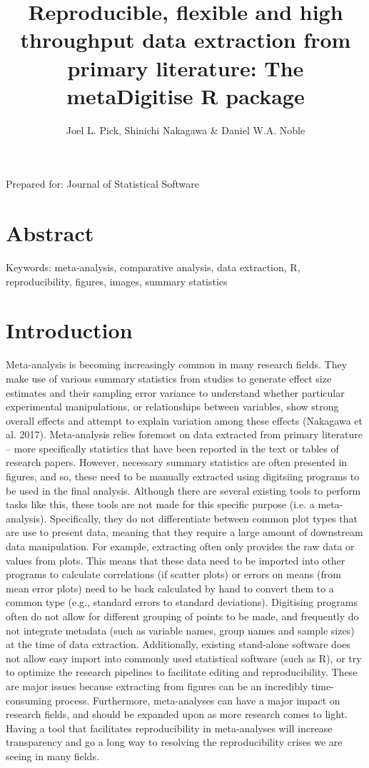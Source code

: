 \documentclass{article}
\title{Reproducible, flexible and high throughput data extraction from primary literature: The metaDigitise R package}
\author{Joel L. Pick, Shinichi Nakagawa \& Daniel W.A. Noble}
\begin{document}
\doublespacing

\maketitle
Prepared for: Journal of Statistical Software

\section*{Abstract}

Keywords: meta-analysis, comparative analysis, data extraction, R, reproducibility, figures, images, summary statistics

\clearpage
\section*{Introduction}

Meta-analysis is becoming increasingly common in many research fields. They make use of various summary statistics from studies to generate effect size estimates and their sampling error variance to understand whether particular experimental manipulations, or relationships between variables, show strong overall effects and attempt to explain variation among these effects (Nakagawa et al. 2017). Meta-analysis relies foremost on data extracted from primary literature – more specifically statistics that have been reported in the text or tables of research papers. However, necessary summary statistics are often presented in figures, and so, these need to be manually extracted using digitsiing programs to be used in the final analysis. Although there are several existing tools to perform tasks like this, these tools are not made for this specific purpose (i.e. a meta-analysis). Specifically, they do not differentiate between common plot types that are use to present data, meaning that they require a large amount of downstream data manipulation. For example, extracting often only provides the raw data or values from plots. This means that these data need to be imported into other programs to calculate correlations (if scatter plots) or errors on means (from mean error plots) need to be back calculated by hand to convert them to a common type (e.g., standard errors to standard deviations). Digitising programs often do not allow for different grouping of points to be made, and frequently do not integrate metadata (such as variable names, group names and sample sizes) at the time of data extraction. Additionally, existing stand-alone software does not allow easy import into commonly used statistical software (such as R), or try to optimize the research pipelines to facilitate editing and reproducibility. These are major issues because extracting from figures can be an incredibly time-consuming process. Furthermore, meta-analyses can have a major impact on research fields, and should be expanded upon as more research comes to light. Having a tool that facilitates reproducibility in meta-analyses will increase transparency and go a long way to resolving the reproducibility crises we are seeing in many fields.
\end{document}
